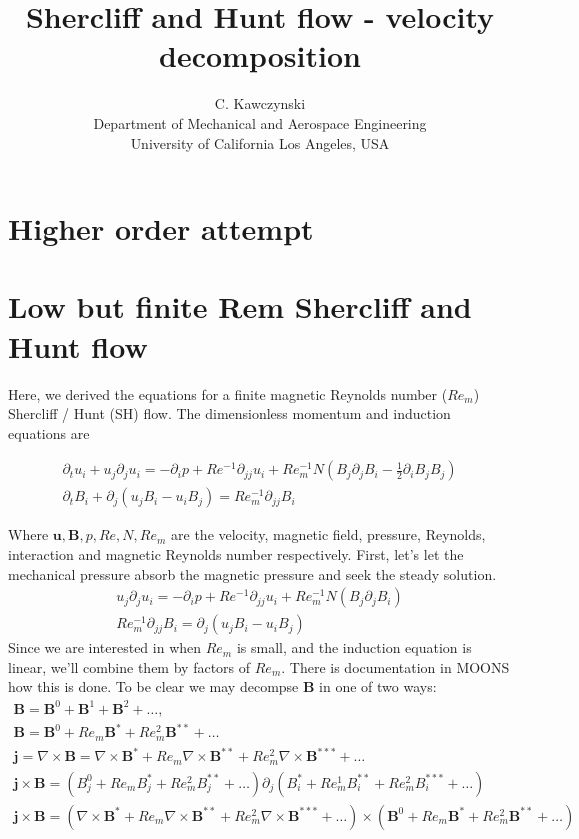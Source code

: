 \documentclass[11pt]{article}
\newcommand{\B}{\mathbf{B}}
\newcommand{\U}{\mathbf{u}}
\newcommand{\curl}{\nabla \times}
\newcommand{\PD}{\partial}
\newcommand{\J}{\mathbf{j}}
\begin{document}
\doublespacing
\title{Shercliff and Hunt flow - velocity decomposition}
\author{C. Kawczynski \\
Department of Mechanical and Aerospace Engineering \\
University of California Los Angeles, USA\\
}
\maketitle

\section{Higher order attempt}
\section{Low but finite Rem Shercliff and Hunt flow}
Here, we derived the equations for a finite magnetic Reynolds number ($Re_m$) Shercliff / Hunt (SH) flow. The dimensionless momentum and induction equations are

\begin{equation}\begin{aligned}
\PD_t u_i+u_j\PD_j u_i =-\PD_i p+ Re^{-1} \PD_{jj} u_i + Re_m^{-1} N (B_j \PD_j B_i - \tfrac{1}{2} \PD_i B_j B_j) \\
\PD_t B_i + \PD_j (u_j B_i - u_i B_j) = Re_m^{-1} \PD_{jj} B_i
\end{aligned} \end{equation}

Where $\U,\B,p,Re,N,Re_m$ are the velocity, magnetic field, pressure, Reynolds, interaction and magnetic Reynolds number respectively. First, let's let the mechanical pressure absorb the magnetic pressure and seek the steady solution.
\begin{equation}\begin{aligned}
u_j\PD_j u_i =-\PD_i p+ Re^{-1} \PD_{jj} u_i + Re_m^{-1} N (B_j \PD_j B_i) \\
Re_m^{-1} \PD_{jj} B_i = \PD_j (u_j B_i - u_i B_j)
\end{aligned} \end{equation}
Since we are interested in when $Re_m$ is small, and the induction equation is linear, we'll combine them by factors of $Re_m$. There is documentation in MOONS how this is done. To be clear we may decompse $\B$ in one of two ways:
\begin{equation}\begin{aligned}
	\B = \B^0 + \B^1 + \B^2 + \hdots , \\
	\B = \B^0 + Re_m \B^* + Re_m^2 \B^{**} + \hdots \\
	\J = \curl \B = \curl \B^* + Re_m \curl \B^{**} + Re_m^2 \curl \B^{***} + \hdots \\
	\J \times \B = (B_j^0+Re_m B_j^*+Re_m^2 B_j^{**} + \hdots) \PD_j (B_i^*+Re_m^1 B_i^{**}+Re_m^2 B_i^{***} + \hdots) \\
	\J \times \B = (\curl \B^* + Re_m \curl \B^{**} + Re_m^2 \curl \B^{***} + \hdots) \times (\B^0 + Re_m \B^* + Re_m^2 \B^{**} + \hdots) \\
\end{aligned} \end{equation}
\end{document}

